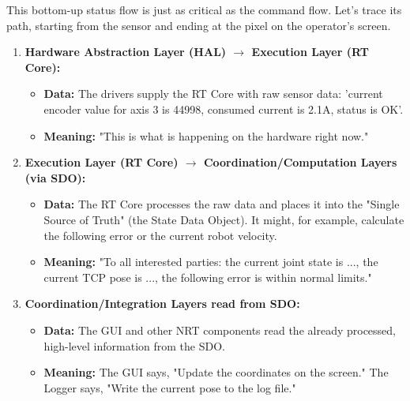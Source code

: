 This bottom-up status flow is just as critical as the command flow. Let's trace its path, starting from the sensor and ending at the pixel on the operator's screen.
\begin{enumerate}
    \item \textbf{Hardware Abstraction Layer (HAL) $\rightarrow$ Execution Layer (RT Core):}
    \begin{itemize}
        \item \textbf{Data:} The drivers supply the RT Core with raw sensor data: 'current encoder value for axis 3 is 44998, consumed current is 2.1A, status is OK'.
        \item \textbf{Meaning:} "This is what is happening on the hardware right now."
    \end{itemize}
    
    \item \textbf{Execution Layer (RT Core) $\rightarrow$ Coordination/Computation Layers (via SDO):}
    \begin{itemize}
        \item \textbf{Data:} The RT Core processes the raw data and places it into the "Single Source of Truth" (the State Data Object). It might, for example, calculate the following error or the current robot velocity.
        \item \textbf{Meaning:} "To all interested parties: the current joint state is {...}, the current TCP pose is {...}, the following error is within normal limits."
    \end{itemize}

    \item \textbf{Coordination/Integration Layers read from SDO:}
    \begin{itemize}
        \item \textbf{Data:} The GUI and other NRT components read the already processed, high-level information from the SDO.
        \item \textbf{Meaning:} The GUI says, "Update the coordinates on the screen." The Logger says, "Write the current pose to the log file."
    \end{itemize}
\end{enumerate}

